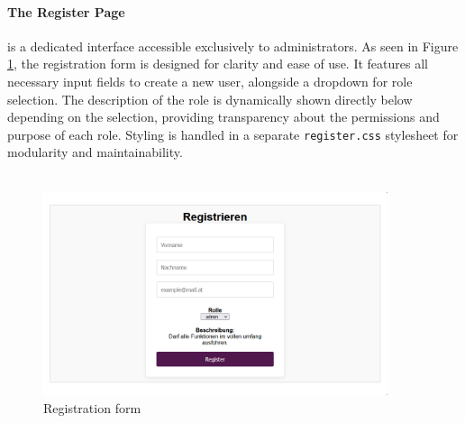 \documentclass[a4paper,12pt]{report}
\begin{document}
\paragraph{The Register Page} is a dedicated interface accessible exclusively to administrators. As seen in Figure \ref{fig:register_view}, the registration form is designed for clarity and ease of use. It features all necessary input fields to create a new user, alongside a dropdown for role selection. The description of the role is dynamically shown directly below depending on the selection, providing transparency about the permissions and purpose of each role. Styling is handled in a separate \texttt{register.css} stylesheet for modularity and maintainability.\\\\ 
\begin{figure}[H]
	\centering
	\includegraphics[width=0.9\textwidth]{pics/register_view.png}
	\caption{Registration form}
	\label{fig:register_view}
\end{figure}
\end{document}
